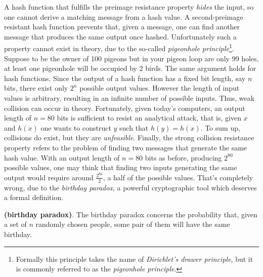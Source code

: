 \bigskip
\noindent
A hash function that fulfills the preimage resistance property \textit{hides} the input, so one cannot derive a matching message from a hash value. A second-preimage resistant hash function prevents that, given a message, one can find another message that produces the same output once hashed. Unfortunately such a property cannot exist in theory, due to the so-called \textit{pigeonhole principle}\footnote{Formally this principle takes the name of \textit{Dirichlet's drawer principle}, but it is commonly referred to as the \textit{pigeonhole principle}.}. Suppose to be the owner of 100 pigeons but in your pigeon loop are only 99 holes, at least one pigeonhole will be occupied by 2 birds. The same argument holds for hash functions. Since the output of a hash function has a fixed bit length, say $n$ bits, there exist only $2^{n}$ possible output values. However the length of input values is arbitrary, resulting in an infinite number of possible inputs. Thus, weak collision can occur in theory. Fortunately, given today's computers, an output length of $n=80$ bits is sufficient to resist an analytical attack, that is, given $x$ and $h(x)$ one wants to construct $y$ such that $h(y)=h(x)$. To sum up, collisions do exist, but they are \textit{unfeasible}. Finally, the strong collision resistance property refers to the problem of finding two messages that generate the same hash value. With an output length of $n=80$ bits as before, producing $2^{80}$ possible values, one may think that finding two inputs generating the same output would require around $\frac{2^{80}}{2}$, a half of the possible values. That's completely wrong, due to the \textit{birthday paradox}, a powerful cryptographic tool which deserves a formal definition.
\begin{mydef} {\bf (birthday paradox)}.
    The birthday paradox concerns the probability that, given a set of $n$ randomly chosen people, some pair of them will have the same birthday.
\end{mydef}

